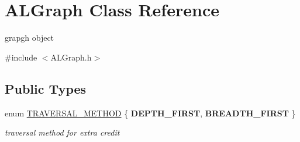 \hypertarget{classALGraph}{\section{A\-L\-Graph Class Reference}
\label{classALGraph}
}


grapgh object  




{\ttfamily \#include $<$A\-L\-Graph.\-h$>$}

\subsection*{Public Types}
\begin{DoxyCompactItemize}
\item 
enum \hyperlink{classALGraph_a7680b77bf39c4dd40bc75b5b579306b3}{T\-R\-A\-V\-E\-R\-S\-A\-L\-\_\-\-M\-E\-T\-H\-O\-D} \{ {\bfseries D\-E\-P\-T\-H\-\_\-\-F\-I\-R\-S\-T}, 
{\bfseries B\-R\-E\-A\-D\-T\-H\-\_\-\-F\-I\-R\-S\-T}
 \}
\begin{DoxyCompactList}\small\item\em traversal method for extra credit \end{DoxyCompactList}\end{DoxyCompactItemize}
